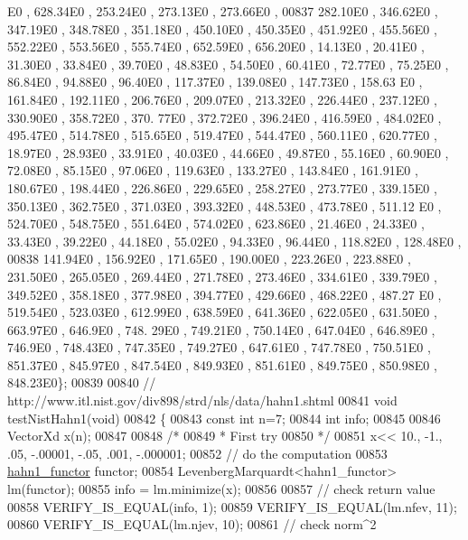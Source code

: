\begin{DoxyCode}
      E0 , 628.34E0 , 253.24E0 , 273.13E0 , 273.66E0 ,
00837 282.10E0 , 346.62E0 , 347.19E0 , 348.78E0 , 351.18E0 , 450.10E0 , 450.35E0 , 451.92E0 , 455.56E0 , 552.22E0
       , 553.56E0 , 555.74E0 , 652.59E0 , 656.20E0 , 14.13E0 , 20.41E0 , 31.30E0 , 33.84E0 , 39.70E0 , 48.83E0 , 
      54.50E0 , 60.41E0 , 72.77E0 , 75.25E0 , 86.84E0 , 94.88E0 , 96.40E0 , 117.37E0 , 139.08E0 , 147.73E0 , 158.63
      E0 , 161.84E0 , 192.11E0 , 206.76E0 , 209.07E0 , 213.32E0 , 226.44E0 , 237.12E0 , 330.90E0 , 358.72E0 , 370.
      77E0 , 372.72E0 , 396.24E0 , 416.59E0 , 484.02E0 , 495.47E0 , 514.78E0 , 515.65E0 , 519.47E0 , 544.47E0 , 
      560.11E0 , 620.77E0 , 18.97E0 , 28.93E0 , 33.91E0 , 40.03E0 , 44.66E0 , 49.87E0 , 55.16E0 , 60.90E0 , 72.08E0 
      , 85.15E0 , 97.06E0 , 119.63E0 , 133.27E0 , 143.84E0 , 161.91E0 , 180.67E0 , 198.44E0 , 226.86E0 , 229.65E0 
      , 258.27E0 , 273.77E0 , 339.15E0 , 350.13E0 , 362.75E0 , 371.03E0 , 393.32E0 , 448.53E0 , 473.78E0 , 511.12
      E0 , 524.70E0 , 548.75E0 , 551.64E0 , 574.02E0 , 623.86E0 , 21.46E0 , 24.33E0 , 33.43E0 , 39.22E0 , 44.18E0 ,
       55.02E0 , 94.33E0 , 96.44E0 , 118.82E0 , 128.48E0 ,
00838 141.94E0 , 156.92E0 , 171.65E0 , 190.00E0 , 223.26E0 , 223.88E0 , 231.50E0 , 265.05E0 , 269.44E0 , 271.78E0
       , 273.46E0 , 334.61E0 , 339.79E0 , 349.52E0 , 358.18E0 , 377.98E0 , 394.77E0 , 429.66E0 , 468.22E0 , 487.27
      E0 , 519.54E0 , 523.03E0 , 612.99E0 , 638.59E0 , 641.36E0 , 622.05E0 , 631.50E0 , 663.97E0 , 646.9E0  , 748.
      29E0 , 749.21E0 , 750.14E0 , 647.04E0 , 646.89E0 , 746.9E0  , 748.43E0 , 747.35E0 , 749.27E0 , 647.61E0 , 
      747.78E0 , 750.51E0 , 851.37E0 , 845.97E0 , 847.54E0 , 849.93E0 , 851.61E0 , 849.75E0 , 850.98E0 , 848.23E0\};
00839 
00840 \textcolor{comment}{// http://www.itl.nist.gov/div898/strd/nls/data/hahn1.shtml}
00841 \textcolor{keywordtype}{void} testNistHahn1(\textcolor{keywordtype}{void})
00842 \{
00843   \textcolor{keyword}{const} \textcolor{keywordtype}{int}  n=7;
00844   \textcolor{keywordtype}{int} info;
00845 
00846   VectorXd x(n);
00847 
00848   \textcolor{comment}{/*}
00849 \textcolor{comment}{   * First try}
00850 \textcolor{comment}{   */}
00851   x<< 10., -1., .05, -.00001, -.05, .001, -.000001;
00852   \textcolor{comment}{// do the computation}
00853   \hyperlink{structhahn1__functor}{hahn1\_functor} functor;
00854   LevenbergMarquardt<hahn1\_functor> lm(functor);
00855   info = lm.minimize(x);
00856 
00857   \textcolor{comment}{// check return value}
00858   VERIFY\_IS\_EQUAL(info, 1);
00859   VERIFY\_IS\_EQUAL(lm.nfev, 11);
00860   VERIFY\_IS\_EQUAL(lm.njev, 10);
00861   \textcolor{comment}{// check norm^2}

\end{DoxyCode}
